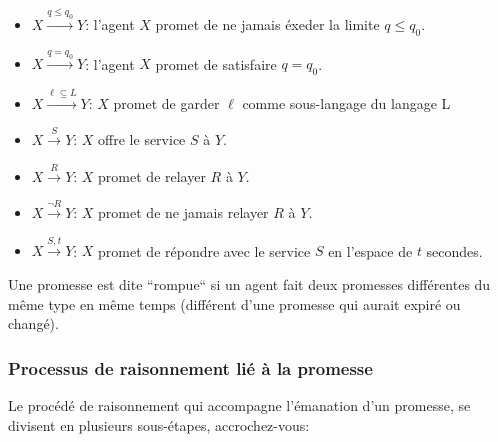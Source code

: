 \begin{itemize}
    \item $X \xrightarrow{q \leq q_0} Y $: l'agent $X$ promet de ne jamais éxeder la
        limite $q \leq q_0$.
    \item $X \xrightarrow{q = q_0} Y $: l'agent $X$ promet de satisfaire
        $q = q_0$.
    \item $X \xrightarrow{\ell \subseteq  L} Y $: $X$ promet de garder $\ell$
        comme sous-langage du langage L
    \item $X \xrightarrow{S} Y $: $X$ offre le service $S$ à $Y$.
    \item $X \xrightarrow{R} Y $: $X$ promet de relayer $R$ à $Y$.
    \item $X \xrightarrow{\neg R} Y $: $X$ promet de ne jamais relayer $R$ à $Y$.
    \item $X \xrightarrow{S,t} Y $: $X$ promet de répondre avec le service $S$
        en l'espace de $t$ secondes.
\end{itemize}

Une promesse est dite ``rompue`` si un agent fait deux promesses différentes du
même type en même temps (différent d'une promesse qui aurait expiré ou changé).

\subsubsection{Processus de raisonnement lié à la promesse}

Le procédé de raisonnement qui accompagne l'émanation d'un promesse, se divisent
en plusieurs sous-étapes, accrochez-vous:

